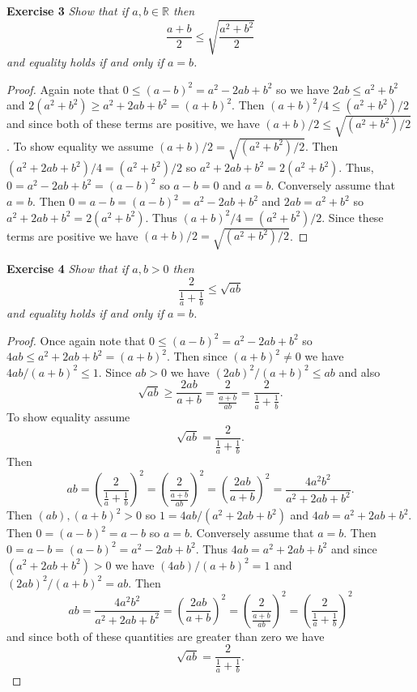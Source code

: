 \documentclass{article}
\begin{document}
\begin{flushleft}
\textbf{Exercise 3}
\textsl{Show that if $a,b \in \mathbb{R}$ then
\[
\frac{a+b}{2} \leq \sqrt{\frac{a^2+b^2}{2}}
\]
and equality holds if and only if $a=b$.}
\begin{proof}
Again note that $0 \leq (a-b)^2 = a^2 - 2ab + b^2$ so we have $2ab \leq a^2 + b^2$ and $2(a^2+b^2) \geq a^2 + 2ab + b^2 = (a+b)^2$. Then $(a+b)^2/4 \leq (a^2+b^2)/2$ and since both of these terms are positive, we have $(a+b)/2 \leq \sqrt{(a^2+b^2)/2}$. To show equality we assume $(a+b)/2 = \sqrt{(a^2+b^2)/2}$. Then $(a^2+2ab+b^2)/4 = (a^2 + b^2)/2$ so $a^2+2ab+b^2 = 2(a^2+b^2)$. Thus, $0=a^2 - 2ab + b^2=(a-b)^2$ so $a-b=0$ and $a=b$. Conversely assume that $a=b$. Then $0=a-b=(a-b)^2=a^2-2ab+b^2$ and $2ab=a^2+b^2$ so $a^2+2ab+b^2=2(a^2+b^2)$. Thus $(a+b)^2/4=(a^2+b^2)/2$. Since these terms are positive we have $(a+b)/2=\sqrt{(a^2+b^2)/2}$.
\end{proof}

\textbf{Exercise 4}
\textsl{Show that if $a,b > 0$ then
\[
\frac{2}{\frac{1}{a}+\frac{1}{b}} \leq \sqrt{ab}
\]
and equality holds if and only if $a=b$.}
\begin{proof}
Once again note that $0 \leq (a-b)^2 = a^2 - 2ab + b^2$ so $4ab \leq a^2 + 2ab + b^2 = (a+b)^2$. Then since $(a+b)^2 \neq 0$ we have $4ab / (a+b)^2 \leq 1$. Since $ab > 0$ we have $(2ab)^2/(a+b)^2 \leq ab$ and also
\[
\sqrt{ab} \geq \frac{2ab}{a+b} = \frac{2}{\frac{a+b}{ab}} = \frac{2}{\frac{1}{a} + \frac{1}{b}}.
\]
To show equality assume
\[
\sqrt{ab} = \frac{2}{\frac{1}{a} + \frac{1}{b}}.
\]
Then
\[
ab = \left ( \frac{2}{\frac{1}{a} + \frac{1}{b}} \right )^2 = \left ( \frac{2}{\frac{a+b}{ab}} \right )^2 = \left ( \frac{2ab}{a+b} \right )^2 = \frac{4a^2b^2}{a^2+2ab+b^2}.
\]
Then $(ab),(a+b)^2 > 0$ so $1 = 4ab/(a^2+2ab+b^2)$ and $4ab = a^2 + 2ab + b^2$. Then $0=(a-b)^2=a-b$ so $a=b$. Conversely assume that $a=b$. Then $0=a-b=(a-b)^2=a^2-2ab+b^2$. Thus $4ab = a^2 + 2ab + b^2$ and since $(a^2 + 2ab + b^2) > 0$ we have $(4ab)/(a+b)^2=1$ and $(2ab)^2/(a+b)^2=ab$. Then
\[
ab = \frac{4a^2b^2}{a^2+2ab+b^2} = \left ( \frac{2ab}{a+b} \right )^2 = \left ( \frac{2}{\frac{a+b}{ab}} \right )^2 = \left ( \frac{2}{\frac{1}{a} + \frac{1}{b}} \right )^2
\]
and since both of these quantities are greater than zero we have
\[
\sqrt{ab} = \frac{2}{\frac{1}{a} + \frac{1}{b}}.
\]
\end{proof}


\end{flushleft}
\end{document}
